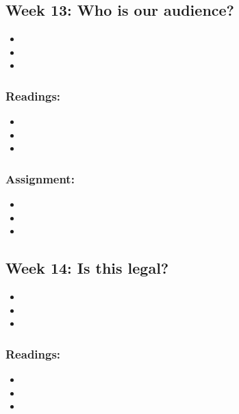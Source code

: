 \documentclass[]{article}
\begin{document}
\subsection{Week 13: Who is our
audience?}\label{week-13-who-is-our-audience}

\begin{itemize}
\item
\item
\item
\end{itemize}

\subsubsection{Readings:}\label{readings-11}

\begin{itemize}
\item
\item
\item
\end{itemize}

\subsubsection{Assignment:}\label{assignment-11}

\begin{itemize}
\item
\item
\item
\end{itemize}

\subsection{Week 14: Is this legal?}\label{week-14-is-this-legal}

\begin{itemize}
\item
\item
\item
\end{itemize}

\subsubsection{Readings:}\label{readings-12}

\begin{itemize}
\item
\item
\item
\end{itemize}
\end{document}
